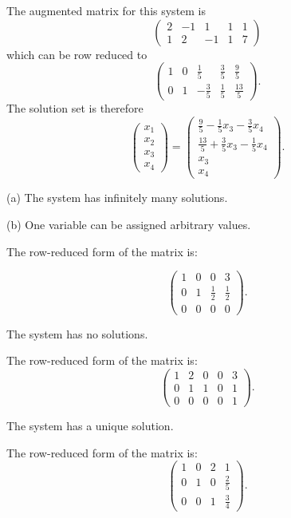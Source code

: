 \documentclass{ximera}
\begin{document}
 The augmented matrix for this system is
\[
\left(\begin{array}{rrrr|r} 2 & -1 & 1 & 1 & 1 \\ 1 & 2 & -1 & 1 & 7
\end{array}\right)
\]
which can be row reduced to
\[
\left(\begin{array}{rrrr|r} 1 & 0 & \frac{1}{5} & \frac{3}{5} &
\frac{9}{5} \\ 0 & 1 & -\frac{3}{5} & \frac{1}{5} & \frac{13}{5}
\end{array}\right).
\]
The solution set is therefore
\[
\left(\begin{array}{c} x_1 \\ x_2 \\ x_3 \\ x_4\end{array}\right) =
\left(\begin{array}{c} \frac{9}{5} - \frac{1}{5}x_3 - \frac{3}{5}x_4
\\ \frac{13}{5} + \frac{3}{5}x_3 - \frac{1}{5}x_4 \\ x_3 \\ x_4
\end{array}\right).
\]

\ans (a) The system has infinitely many solutions.

(b) One variable can be assigned arbitrary values.

\soln The row-reduced form of the matrix is:

\[
\left(\begin{array}{rrr|r} 1 & 0 & 0 & 3 \\ 0 & 1 &
\frac{1}{2} & \frac{1}{2} \\ 0 & 0 & 0 & 0\end{array}\right).
\]

\ans The system has no solutions.

\soln The row-reduced form of the matrix is:
\[
\left(\begin{array}{rrrr|r} 1 & 2 & 0 & 0 & 3 \\
0 & 1 & 1 & 0 & 1 \\ 0 & 0 & 0 & 0 & 1\end{array}\right).
\]

\ans The system has a unique solution.

\soln The row-reduced form of the matrix is:
\[
\left(\begin{array}{rrr|r} 1 & 0 & 2 & 1 \\ 0 & 1 & 0 & \frac{2}{5}
\\ 0 & 0 & 1 & \frac{3}{4}\end{array}\right).
\]
\end{document}
